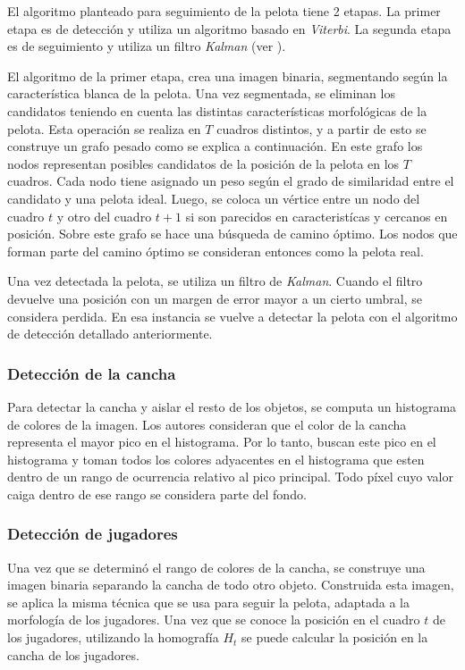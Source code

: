 \documentclass[a4paper,10pt]{article}
\begin{document}
El algoritmo planteado para seguimiento de la pelota tiene 2 etapas.
La primer etapa es de detección y utiliza un algoritmo basado en \textit{Viterbi}.
La segunda etapa es de seguimiento y utiliza un filtro \textit{Kalman} (ver \cite{funk2003study}).

El algoritmo de la primer etapa, crea una imagen binaria, segmentando según la característica blanca de la pelota.
Una vez segmentada, se eliminan los candidatos teniendo en cuenta las distintas características morfológicas de la pelota.
Esta operación se realiza en $T$ cuadros distintos, y a partir de esto se construye un grafo pesado como se explica a continuación.
En este grafo los nodos representan posibles candidatos de la posición de la pelota en los $T$ cuadros.
Cada nodo tiene asignado un peso según el grado de similaridad entre el candidato y una pelota ideal.
Luego, se coloca un vértice entre un nodo del cuadro $t$ y otro del cuadro $t + 1$ si son parecidos en caracteristícas y cercanos en posición.
Sobre este grafo se hace una búsqueda de camino óptimo. Los nodos que forman parte del camino óptimo se consideran entonces
como la pelota real.

Una vez detectada la pelota, se utiliza un filtro de \textit{Kalman}.
Cuando el filtro devuelve una posición con un margen de error mayor a un cierto umbral, se considera perdida.
En esa instancia se vuelve a detectar la pelota con el algoritmo de detección detallado anteriormente.

\subsubsection*{Detección de la cancha}

Para detectar la cancha y aislar el resto de los objetos, se computa un histograma de colores de la imagen.
Los autores consideran que el color de la cancha representa el mayor pico en el histograma.
Por lo tanto, buscan este pico en el histograma y toman todos los colores adyacentes en el histograma que esten dentro de un rango de ocurrencia relativo al pico principal.
Todo píxel cuyo valor caiga dentro de ese rango se considera parte del fondo.

\subsubsection*{Detección de jugadores}

Una vez que se determinó el rango de colores de la cancha, se construye una imagen binaria separando la cancha de todo otro objeto.
Construida esta imagen, se aplica la misma técnica que se usa para seguir la pelota, adaptada a la morfología de los jugadores.
Una vez que se conoce la posición en el cuadro $t$ de los jugadores, utilizando la homografía $H_t$ se puede calcular la posición
en la cancha de los jugadores.

\printbibliography
\end{document}
